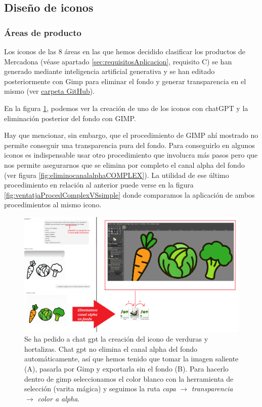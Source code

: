 \documentclass[a4paper,12pt]{report}
\begin{document}
	
	\subsection{Diseño de iconos}
	
	\subsubsection{Áreas de producto}
	
	Los iconos de las 8 áreas en las que hemos decidido clasificar los productos de Mercadona (véase apartado \ref{sec:requisitosAplicacion}, requisito C) se han generado mediante inteligencia artificial generativa y se han editado posteriormente con Gimp para eliminar el fondo y generar transparencia en el mismo (ver \href{https://github.com/blackcub3s/mercApp/tree/main/creacioIconos/categoriesProductes}{carpeta GitHub}).
	
	
	En la figura \ref{fig:eliminocanalalpha}, podemos ver la creación de uno de los iconos con chatGPT y la eliminación posterior del fondo con GIMP. 
	
	Hay que mencionar, sin embargo, que el procedimiento de GIMP ahí mostrado no permite conseguir una transparencia pura del fondo. Para conseguirlo en algunos iconos es indispensable usar otro procedimiento que involucra más pasos pero que nos permite asegurarnos que se elimina por completo el canal alpha del fondo (ver figura \ref{fig:eliminocanalalphaCOMPLEX}). La utilidad de ese último procedimiento en relación al anterior puede verse en la figura \ref{fig:ventatjaProcedComplexVSsimple} donde comparamos la aplicación de ambos procedimientos al mismo icono.


	
	
	
	
\FloatBarrier
\setlength{\belowcaptionskip}{3pt}
\begin{figure}[H]
	\centering
	\caption{Se ha pedido a chat gpt la creación del icono de verduras y hortalizas. Chat gpt no elimina el canal alpha del fondo automáticamente, así que hemos tenido que tomar la imagen saliente (A), pasarla por Gimp y exportarla  sin el fondo (B). Para hacerlo dentro de gimp seleccionamos el color blanco con la herramienta de selección (varita mágica) y seguimos la ruta \textit{capa} $\rightarrow$ \textit{transparencia} $\rightarrow$ \textit{color a alpha}.}
	\includegraphics[width=1\linewidth]{img/eliminoCanalAlpha}


	\label{fig:eliminocanalalpha}
\end{figure}
\FloatBarrier
\end{document}
